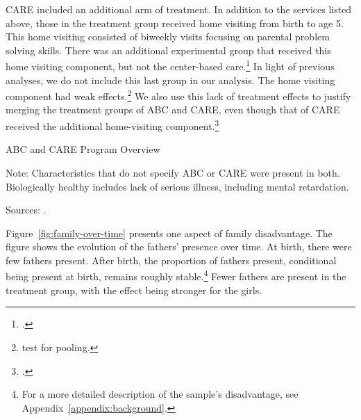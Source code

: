 CARE included an additional arm of treatment. In addition to the services listed above, those in the treatment group received home visiting from birth to age 5. This home visiting consisted of biweekly visits focusing on parental problem solving skills. There was an additional experimental group that received this home visiting component, but not the center-based care.\footnote{\citet{Wasik_Ramey_etal_1990_CD}.} In light of previous analyses, we do not include this last group in our analysis. The home visiting component had weak effects.\footnote{\citet{Campbell_Conti_etal_2014_EarlyChildhoodInvestments} test for pooling.} We also use this lack of treatment effects to justify merging the treatment groups of ABC and CARE, even though that of CARE received the additional home-visiting component.\footnote{\citet{ABCCARE_Dataset}.}

\begin{table}[H]
\centering
\caption{ABC and CARE Program Overview}
\label{tab:abc-care-characteristics}
\begin{threeparttable}
	
\begin{tablenotes}
\footnotesize
\item Note: Characteristics that do not specify ABC or CARE were present in both. Biologically healthy includes lack of serious illness, including mental retardation. \\
\item Sources: \citet{Ramey_Collier_etal_1976_CarolinaAbecedarianProject,Ramey_Smith_1977_AJMD,Ramey_etal_1985_Project-CARE_TiECSE,Wasik_Ramey_etal_1990_CD,Ramey_Campbell_1991_childreninpoverty}.
\end{tablenotes}
\end{threeparttable}
\end{table}

Figure~\ref{fig:family-over-time} presents one aspect of family disadvantage.  The figure shows the evolution of the fathers' presence over time. At birth, there were few fathers present. After birth, the proportion of fathers present, conditional being present at birth, remains roughly stable.\footnote{For a more detailed description of the sample's disadvantage, see Appendix~\ref{appendix:background}.} Fewer fathers are present in the treatment group, with the effect being stronger for the girls.

